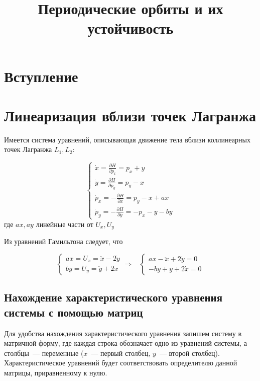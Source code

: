 \documentclass[12pt, a4paper]{article}
\title{Периодические орбиты и их устойчивость}
\date{}
\author{}
\begin{document}
\maketitle
\tableofcontents
\newpage
\section{Вступление}

\section{Линеаризация вблизи точек Лагранжа}

Имеется система уравнений, описывающая движение тела вблизи коллинеарных точек Лагранжа  $L_1, L_2$:

\begin{equation}
\label{eq:linear}
    \begin{cases}
        \dot x = \frac{\partial H}{\partial p_x} = p_x + y\\
        \dot y = \frac{\partial H}{\partial p_y} = p_y - x\\
        \dot p_x = - \frac{\partial H}{\partial x} = p_y - x + ax\\
        \dot p_y = - \frac{\partial H}{\partial y} = - p_x - y - by
    \end{cases}
\end{equation}
где $ax, ay$ линейные части от $U_x, U_y$

Из уравнений Гамильтона следует, что 

\begin{equation}
    \begin{cases}
        ax = U_x = \ddot x - 2 \dot y\\
        by = U_y = \ddot y + 2 \dot x
    \end{cases}
    \Rightarrow
    \;\;\;
    \begin{cases}
         ax - \ddot x + 2 \dot y = 0\\
         - by + \ddot y + 2 \dot x = 0
    \end{cases}
\end{equation}

\subsection{Нахождение характеристического уравнения системы с помощью матриц}

Для удобства нахождения характеристического уравнения запишем систему в матричной форму, где каждая строка обозначает одно из уравнений системы, а столбцы~--- переменные ($x$~---  первый столбец, $y$~--- второй столбец). Характеристическое уравнений будет соответствовать определителю данной матрицы, приравненному к нулю.\\ 
\end{document}
